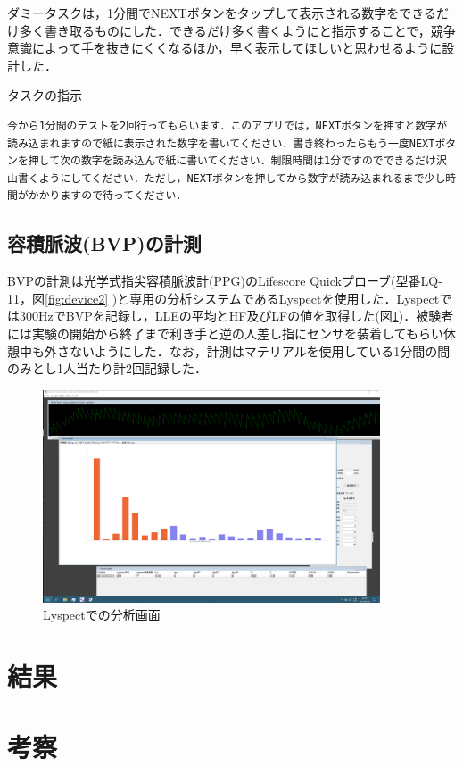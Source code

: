 ダミータスクは，1分間でNEXTボタンをタップして表示される数字をできるだけ多く書き取るものにした．できるだけ多く書くようにと指示することで，競争意識によって手を抜きにくくなるほか，早く表示してほしいと思わせるように設計した．

\begin{itembox}[l]{タスクの指示}
\begin{verbatim}
今から1分間のテストを2回行ってもらいます．このアプリでは，NEXTボタンを押すと数字が読み込まれますので紙に表示された数字を書いてください．書き終わったらもう一度NEXTボタンを押して次の数字を読み込んで紙に書いてください．制限時間は1分ですのでできるだけ沢山書くようにしてください．ただし，NEXTボタンを押してから数字が読み込まれるまで少し時間がかかりますので待ってください．
\end{verbatim}
\end{itembox}

\subsection{容積脈波(BVP)の計測}
BVPの計測は光学式指尖容積脈波計(PPG)のLifescore Quickプローブ(型番LQ-11，図\ref{fig:device2} )と専用の分析システムであるLyspect\cite{chaotechlyspect}を使用した．Lyspectでは300HzでBVPを記録し，LLEの平均とHF及びLFの値を取得した(図\ref{fig:lyspect})．被験者には実験の開始から終了まで利き手と逆の人差し指にセンサを装着してもらい休憩中も外さないようにした．なお，計測はマテリアルを使用している1分間の間のみとし1人当たり計2回記録した．


\begin{figure}[htbp]
  \begin{minipage}{\hsize}
    \begin{center}
       \includegraphics[width=100mm]{img/lyspect.png}
    \end{center}
    \caption{Lyspectでの分析画面}
    \label{fig:lyspect}
  \end{minipage}
\end{figure}


\section{結果}

\section{考察}

